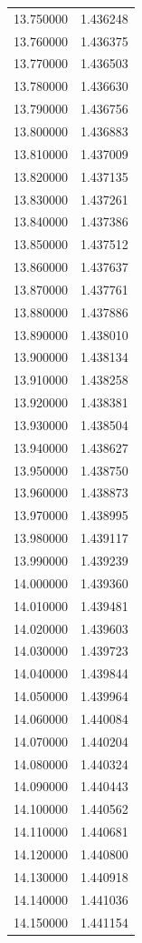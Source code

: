 \begin{tabular}{rr}
13.750000 & 1.436248 \\
13.760000 & 1.436375 \\
13.770000 & 1.436503 \\
13.780000 & 1.436630 \\
13.790000 & 1.436756 \\
13.800000 & 1.436883 \\
13.810000 & 1.437009 \\
13.820000 & 1.437135 \\
13.830000 & 1.437261 \\
13.840000 & 1.437386 \\
13.850000 & 1.437512 \\
13.860000 & 1.437637 \\
13.870000 & 1.437761 \\
13.880000 & 1.437886 \\
13.890000 & 1.438010 \\
13.900000 & 1.438134 \\
13.910000 & 1.438258 \\
13.920000 & 1.438381 \\
13.930000 & 1.438504 \\
13.940000 & 1.438627 \\
13.950000 & 1.438750 \\
13.960000 & 1.438873 \\
13.970000 & 1.438995 \\
13.980000 & 1.439117 \\
13.990000 & 1.439239 \\
14.000000 & 1.439360 \\
14.010000 & 1.439481 \\
14.020000 & 1.439603 \\
14.030000 & 1.439723 \\
14.040000 & 1.439844 \\
14.050000 & 1.439964 \\
14.060000 & 1.440084 \\
14.070000 & 1.440204 \\
14.080000 & 1.440324 \\
14.090000 & 1.440443 \\
14.100000 & 1.440562 \\
14.110000 & 1.440681 \\
14.120000 & 1.440800 \\
14.130000 & 1.440918 \\
14.140000 & 1.441036 \\
14.150000 & 1.441154 \\

\end{tabular}

